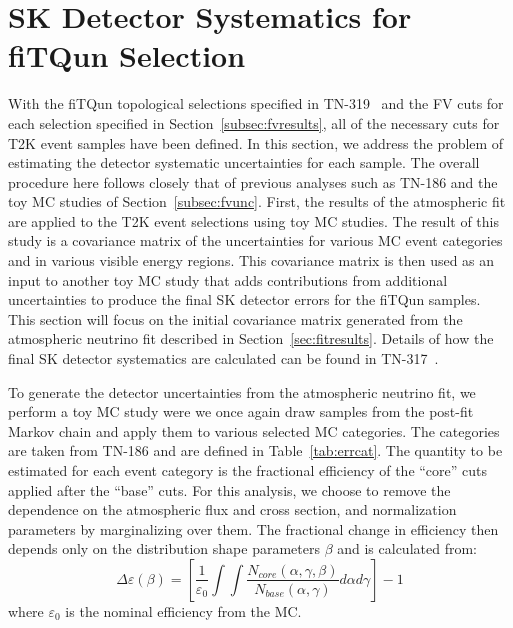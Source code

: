 

\section{SK Detector Systematics for fiTQun Selection}
\label{sec:skerr}

With the fiTQun topological selections specified in TN-319~\cite{tn319} and the FV cuts
for each selection specified in Section~\ref{subsec:fvresults}, all of the necessary
cuts for T2K event samples have been defined.  In this section, we address the
problem of estimating the detector systematic uncertainties for each sample.
The overall procedure here follows closely that of previous analyses such
as TN-186 and the toy MC studies of Section~\ref{subsec:fvunc}.  First, the
results of the atmospheric fit are applied to the T2K
event selections using toy MC studies. The result of this study is a covariance
matrix of the uncertainties for various MC event categories and in various
visible energy regions.  This covariance matrix is then used as an input to
another toy MC study that adds contributions from additional uncertainties to
produce the final SK detector errors for the fiTQun samples.  This section will
focus on the initial covariance matrix generated from the atmospheric neutrino
fit described in Section~\ref{sec:fitresults}.  Details of how the final SK
detector systematics are calculated can be found in TN-317~\cite{tn317}.

To generate the detector uncertainties from the atmospheric neutrino fit, we
perform a toy MC study were we once again draw samples from the post-fit Markov
chain and apply them to various selected MC categories.  The categories are
taken from TN-186 and are defined in Table~\ref{tab:errcat}. The quantity to
be estimated for each event category is the fractional efficiency of the ``core''
cuts applied after the ``base'' cuts.  For this analysis, we choose to remove the 
dependence on the atmospheric flux and cross section, and normalization parameters by 
marginalizing over them.  The fractional change in efficiency then depends only
on the distribution shape parameters $\beta$ and is calculated from:
%
\begin{equation}
  \label{eq:deleff}
  \Delta \varepsilon(\beta) = \left[ \frac{1}{\varepsilon_{0}}
  \int\int\frac{N_{core}(\alpha,\gamma,\beta)}{N_{base}(\alpha,\gamma)}d\alpha d\gamma \right] - 1
\end{equation}
%
where $\varepsilon_{0}$ is the nominal efficiency from the MC.

